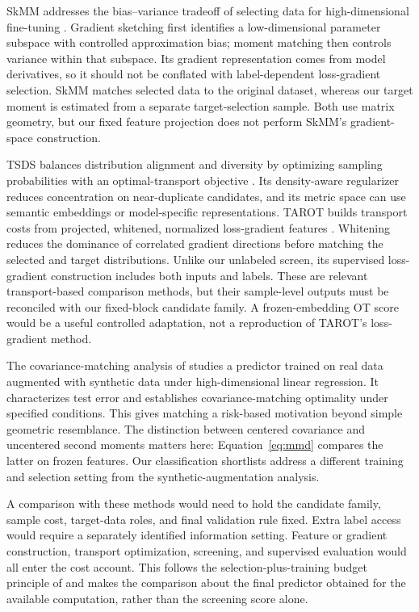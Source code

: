 SkMM addresses the bias--variance tradeoff of selecting data for high-dimensional fine-tuning \citep{dong2024skmm}. Gradient sketching first identifies a low-dimensional parameter subspace with controlled approximation bias; moment matching then controls variance within that subspace. Its gradient representation comes from model derivatives, so it should not be conflated with label-dependent loss-gradient selection. SkMM matches selected data to the original dataset, whereas our target moment is estimated from a separate target-selection sample. Both use matrix geometry, but our fixed feature projection does not perform SkMM's gradient-space construction.

TSDS balances distribution alignment and diversity by optimizing sampling probabilities with an optimal-transport objective \citep{liu2024tsds}. Its density-aware regularizer reduces concentration on near-duplicate candidates, and its metric space can use semantic embeddings or model-specific representations. TAROT builds transport costs from projected, whitened, normalized loss-gradient features \citep{feng2025tarot}. Whitening reduces the dominance of correlated gradient directions before matching the selected and target distributions. Unlike our unlabeled screen, its supervised loss-gradient construction includes both inputs and labels. These are relevant transport-based comparison methods, but their sample-level outputs must be reconciled with our fixed-block candidate family. A frozen-embedding OT score would be a useful controlled adaptation, not a reproduction of TAROT's loss-gradient method.

The covariance-matching analysis of \citet{rezaei2026synthetic} studies a predictor trained on real data augmented with synthetic data under high-dimensional linear regression. It characterizes test error and establishes covariance-matching optimality under specified conditions. This gives matching a risk-based motivation beyond simple geometric resemblance. The distinction between centered covariance and uncentered second moments matters here: Equation~\eqref{eq:mmd} compares the latter on frozen features. Our classification shortlists address a different training and selection setting from the synthetic-augmentation analysis.

A comparison with these methods would need to hold the candidate family, sample cost, target-data roles, and final validation rule fixed. Extra label access would require a separately identified information setting. Feature or gradient construction, transport optimization, screening, and supervised evaluation would all enter the cost account. This follows the selection-plus-training budget principle of \citet{yin2025} and makes the comparison about the final predictor obtained for the available computation, rather than the screening score alone.

